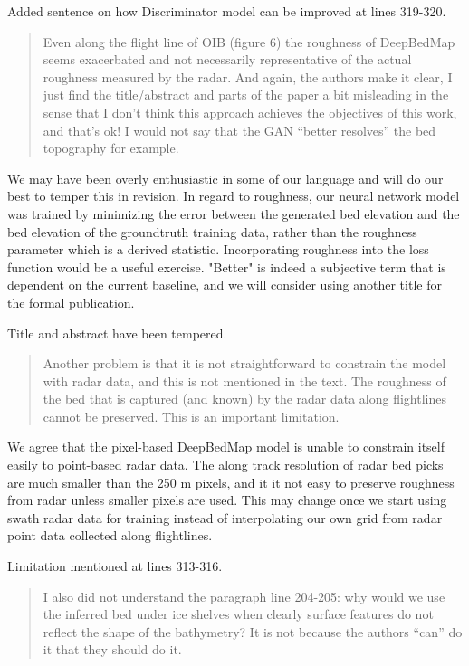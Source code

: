 \documentclass{article}
\begin{document}
{
  \color{ForestGreen}
   Added sentence on how Discriminator model can be improved at lines 319-320.
}

\begin{quote}
\color{blue}
  Even along the flight line of OIB (figure 6) the roughness of DeepBedMap seems exacerbated and not necessarily representative of the actual roughness measured by the radar.
  And again, the authors make it clear, I just find the title/abstract and parts of the paper a bit misleading in the sense that I don’t think this approach achieves the objectives of this work, and that’s ok!
  I would not say that the GAN “better resolves” the bed topography for example.
\end{quote}

We may have been overly enthusiastic in some of our language and will do our best to temper this in revision.
In regard to roughness, our neural network model was trained by minimizing the error between the generated bed elevation and the bed elevation of the groundtruth training data, rather than the roughness parameter which is a derived statistic.
Incorporating roughness into the loss function would be a useful exercise.
"Better" is indeed a subjective term that is dependent on the current baseline, and we will consider using another title for the formal publication.

{
  \color{ForestGreen}
   Title and abstract have been tempered.
}

\begin{quote}
\color{blue}
Another problem is that it is not straightforward to constrain the model with radar data, and this is not mentioned in the text.
The roughness of the bed that is captured (and known) by the radar data along flightlines cannot be preserved.
This is an important limitation.
\end{quote}

We agree that the pixel-based DeepBedMap model is unable to constrain itself easily to point-based radar data.
The along track resolution of radar bed picks are much smaller than the 250 m pixels, and it it not easy to preserve roughness from radar unless smaller pixels are used.
This may change once we start using swath radar data for training instead of interpolating our own grid from radar point data collected along flightlines.

{
  \color{ForestGreen}
   Limitation mentioned at lines 313-316.
}

\begin{quote}
\color{blue}
  I also did not understand the paragraph line 204-205: why would we use the inferred bed under ice shelves when clearly surface features do not reflect the shape of the bathymetry?
  It is not because the authors “can” do it that they should do it.
\end{quote}
\end{document}
